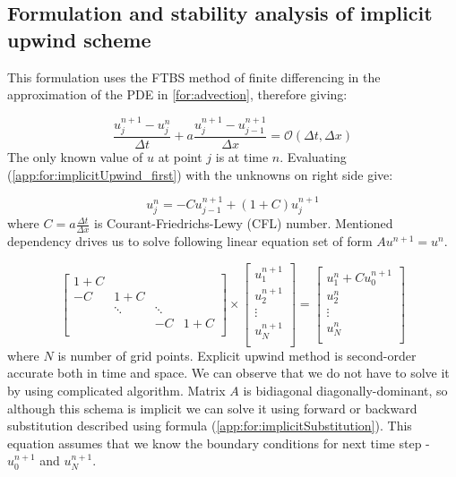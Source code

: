 \subsection{Formulation and stability analysis of implicit upwind scheme} \label{app:implicit}
	This formulation uses the FTBS method of finite differencing in the approximation of the PDE in \ref{for:advection}, therefore giving:
	
	\begin{equation}
		\label{app:for:implicitUpwind_first}
		\frac{u_j^{n+1} - u_j^n}{\Delta t} + a\frac{u_j^{n+1} - u_{j-1}^{n+1}}{\Delta x} = \mathcal{O}(\Delta t, \Delta x)
	\end{equation}	
	The only known value of $u$ at point $j$ is at time $n$. Evaluating (\ref{app:for:implicitUpwind_first}) with the unknowns on right side give:
	
	\begin{equation}
		\label{app:for:implicitUpwind_solution}
		u_j^n = -Cu_{j-1}^{n+1} + (1+C)u_j^{n+1}
	\end{equation}
	where $C=a\frac{\Delta t}{\Delta x}$ is Courant-Friedrichs-Lewy (CFL) number.
	Mentioned dependency drives us to solve following linear equation set of form $Au^{n+1} = u^n$.
	
	\begin{equation}
		\begin{bmatrix}
			1+C & & & \\
			-C & 1+C & & \\ 
			& \ddots & \ddots \\
			& & -C & 1+C \\					
		\end{bmatrix} 
		\times
		\begin{bmatrix}
			u_1^{n+1} \\
			u_2^{n+1} \\
			\vdots	\\
			u_N^{n+1}\\
		\end{bmatrix}
			=
		\begin{bmatrix}
			u_1^{n} + C u_0^{n+1}\\
			u_2^{n} \\
			\vdots	\\
			u_N^{n}\\
		\end{bmatrix}
	\end{equation} 	
	where $N$ is number of grid points.	
	Explicit upwind method is second-order accurate both in time and space. We can observe that we do not have to solve it by using complicated algorithm. Matrix $A$ is bidiagonal diagonally-dominant, so although this schema is implicit we can solve it using forward or backward substitution described using formula (\ref{app:for:implicitSubstitution}). This equation assumes that we know the boundary conditions for next time step - $u_0^{n+1}$ and $u_N^{n+1}$.
	
